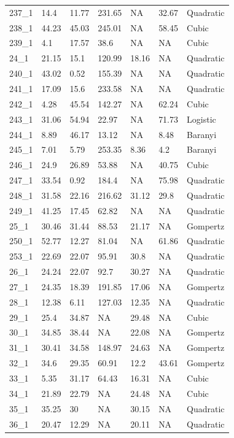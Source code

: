 \documentclass[titlepage]{article}
\begin{document}
\begin{longtable}{lllllll}
237\_1 & 14.4 & 11.77 & 231.65 & NA & 32.67 & Quadratic \\
238\_1 & 44.23 & 45.03 & 245.01 & NA & 58.45 & Cubic \\
239\_1 & 4.1 & 17.57 & 38.6 & NA & NA & Cubic \\
24\_1 & 21.15 & 15.1 & 120.99 & 18.16 & NA & Quadratic \\
240\_1 & 43.02 & 0.52 & 155.39 & NA & NA & Quadratic \\
241\_1 & 17.09 & 15.6 & 233.58 & NA & NA & Quadratic \\
242\_1 & 4.28 & 45.54 & 142.27 & NA & 62.24 & Cubic \\
243\_1 & 31.06 & 54.94 & 22.97 & NA & 71.73 & Logistic \\
244\_1 & 8.89 & 46.17 & 13.12 & NA & 8.48 & Baranyi \\
245\_1 & 7.01 & 5.79 & 253.35 & 8.36 & 4.2 & Baranyi \\
246\_1 & 24.9 & 26.89 & 53.88 & NA & 40.75 & Cubic \\
247\_1 & 33.54 & 0.92 & 184.4 & NA & 75.98 & Quadratic \\
248\_1 & 31.58 & 22.16 & 216.62 & 31.12 & 29.8 & Quadratic \\
249\_1 & 41.25 & 17.45 & 62.82 & NA & NA & Quadratic \\
25\_1 & 30.46 & 31.44 & 88.53 & 21.17 & NA & Gompertz \\
250\_1 & 52.77 & 12.27 & 81.04 & NA & 61.86 & Quadratic \\
253\_1 & 22.69 & 22.07 & 95.91 & 30.8 & NA & Quadratic \\
26\_1 & 24.24 & 22.07 & 92.7 & 30.27 & NA & Quadratic \\
27\_1 & 24.35 & 18.39 & 191.85 & 17.06 & NA & Gompertz \\
28\_1 & 12.38 & 6.11 & 127.03 & 12.35 & NA & Quadratic \\
29\_1 & 25.4 & 34.87 & NA & 29.48 & NA & Cubic \\
30\_1 & 34.85 & 38.44 & NA & 22.08 & NA & Gompertz \\
31\_1 & 30.41 & 34.58 & 148.97 & 24.63 & NA & Gompertz \\
32\_1 & 34.6 & 29.35 & 60.91 & 12.2 & 43.61 & Gompertz \\
33\_1 & 5.35 & 31.17 & 64.43 & 16.31 & NA & Cubic \\
34\_1 & 21.89 & 22.79 & NA & 24.48 & NA & Cubic \\
35\_1 & 35.25 & 30 & NA & 30.15 & NA & Quadratic \\
36\_1 & 20.47 & 12.29 & NA & 20.11 & NA & Quadratic \\

\end{longtable}
\end{document}
